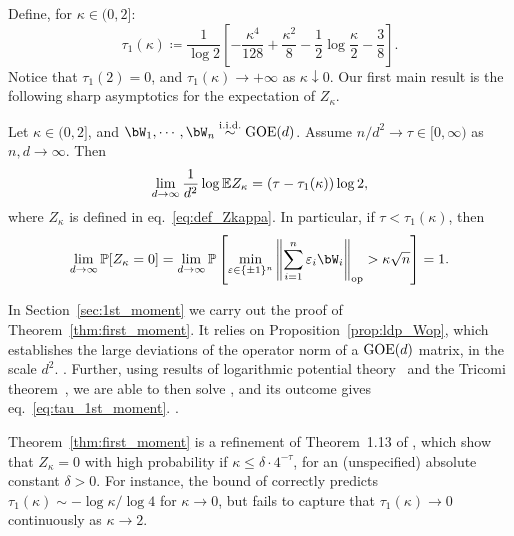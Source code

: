 Define, for $\kappa \in (0,2]$:
\begin{equation}
    \label{eq:tau_1st_moment}
    \tau_1(\kappa) \coloneqq
        \frac{1}{\log 2} \left[- \frac{\kappa^4}{128} + \frac{\kappa^2}{8} - \frac{1}{2} \log \frac{\kappa}{2} - \frac{3}{8}\right].
\end{equation}
Notice that $\tau_1(2) = 0$, and $\tau_1(\kappa) \to +\infty$ as $\kappa \downarrow 0$.
Our first main result is the following sharp asymptotics for the expectation of $Z_\kappa$.
\begin{theorem}\label{thm:first_moment}
    Let $\kappa \in (0,2]$, and $\bW_1, \cdots, \bW_n \iid \GOE(d)$.
    Assume $n/d^2 \to \tau \in [0, \infty)$ as $n, d\to \infty$. 
    Then 
    \begin{equation}
        \label{eq:limit_logEZ}
        \lim_{d \to \infty} \frac{1}{d^2} \log \mathbb{E} Z_\kappa = (\tau - \tau_1(\kappa)) \log 2,
    \end{equation}
    where $Z_\kappa$ is defined in eq.~\eqref{eq:def_Zkappa}.
    In particular, if $\tau < \tau_1(\kappa)$, then
    \begin{equation*}
        \lim_{d \to \infty} \bbP[Z_\kappa = 0] = \lim_{d \to \infty} \bbP\left[\min_{\eps \in \{\pm 1\}^n} \left\|\sum_{i=1}^n \eps_i \bW_i \right\|_\op > \kappa \sqrt{n}\right] = 1.
    \end{equation*}
\end{theorem}
\noindent
In Section~\ref{sec:1st_moment} we carry out the proof of Theorem~\ref{thm:first_moment}. 
It relies on Proposition~\ref{prop:ldp_Wop}, which establishes the large deviations of the operator norm of a 
$\mathrm{GOE}(d)$ matrix, in the scale $d^2$. . 
Further, using results of logarithmic potential theory~\citep{saff2013logarithmic} and the Tricomi theorem~\citep{tricomi1985integral}, we are able to then solve ,
and its outcome gives eq.~\eqref{eq:tau_1st_moment}.
.

\myskip
{}
Theorem~\ref{thm:first_moment} is a refinement of Theorem~1.13 of \cite{kunisky2023online}, 
which show that $Z_\kappa = 0$ with high probability if $\kappa \leq \delta \cdot 4^{-\tau}$, for an (unspecified) absolute constant $\delta > 0$.
For instance, the bound of \cite{kunisky2023online} correctly predicts $\tau_1(\kappa) \sim - \log \kappa / \log 4$ for $\kappa \to 0$, but fails to capture that $\tau_1(\kappa) \to 0$ continuously as $\kappa \to 2$. 

